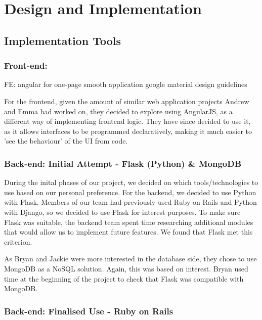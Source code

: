 \documentclass[a4paper, titlepage]{article}
\begin{document}
\newpage
\section{Design and Implementation}

\subsection{Implementation Tools}

\subsubsection{Front-end: }

FE: 
  angular for one-page smooth application
  google material design guidelines

For the frontend, given the amount of similar web application projects Andrew and Emma had worked on, they decided to explore using AngularJS, as a different way of implementing frontend logic. They have since decided to use it, as it allows interfaces to be programmed declaratively, making it much easier to 'see the behaviour' of the UI from code.


\subsubsection{Back-end: Initial Attempt - Flask (Python) \& MongoDB}

During the inital phases of our project, we decided on which tools/technologies to use based on our personal preference. For the backend, we decided to use Python with Flask. Members of our team had previously used Ruby on Rails and Python with Django, so we decided to use Flask for interest purposes. To make sure Flask was suitable, the backend team spent time researching additional modules that would allow us to implement future features. We found that Flask met this criterion.

As Bryan and Jackie were more interested in the database side, they chose to use MongoDB as a NoSQL solution. Again, this was based on interest. Bryan used time at the beginning of the project to check that Flask was compatible with MongoDB. 



\subsubsection{Back-end: Finalised Use - Ruby on Rails} \label{sec:impl_RoR}
\end{document}
